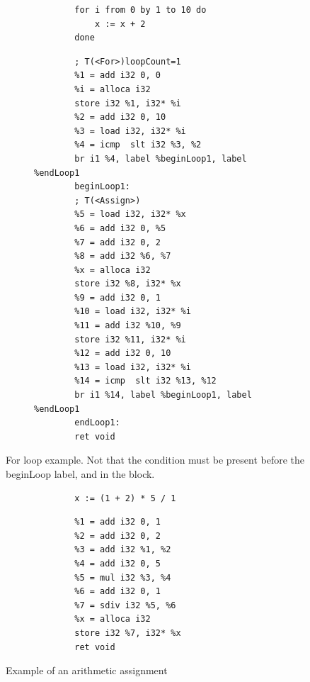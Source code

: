 \documentclass[letterpaper]{article}
\begin{document}
\begin{figure}[H]
    \begin{subfigure}{.5\textwidth}
        \begin{lstlisting}
        for i from 0 by 1 to 10 do
            x := x + 2
        done
        \end{lstlisting}
    \end{subfigure}
    \begin{subfigure}{.5\textwidth}
        \begin{lstlisting}
        ; T(<For>)loopCount=1
    	%1 = add i32 0, 0
    	%i = alloca i32
    	store i32 %1, i32* %i
    	%2 = add i32 0, 10
    	%3 = load i32, i32* %i
    	%4 = icmp  slt i32 %3, %2
    	br i1 %4, label %beginLoop1, label %endLoop1
    	beginLoop1:
    	; T(<Assign>)
    	%5 = load i32, i32* %x
    	%6 = add i32 0, %5
    	%7 = add i32 0, 2
    	%8 = add i32 %6, %7
    	%x = alloca i32
    	store i32 %8, i32* %x
    	%9 = add i32 0, 1
    	%10 = load i32, i32* %i
    	%11 = add i32 %10, %9
    	store i32 %11, i32* %i
    	%12 = add i32 0, 10
    	%13 = load i32, i32* %i
    	%14 = icmp  slt i32 %13, %12
    	br i1 %14, label %beginLoop1, label %endLoop1
    	endLoop1:
    	ret void
        \end{lstlisting}
    \end{subfigure}
    \caption{For loop example. Not that the condition must be present
    before the beginLoop label, and in the block.}
\end{figure}


\begin{figure}[H]
    \begin{subfigure}{.5\textwidth}
        \begin{lstlisting}
        x := (1 + 2) * 5 / 1
        \end{lstlisting}
    \end{subfigure}
    \begin{subfigure}{.5\textwidth}
        \begin{lstlisting}
        %1 = add i32 0, 1
    	%2 = add i32 0, 2
    	%3 = add i32 %1, %2
    	%4 = add i32 0, 5
    	%5 = mul i32 %3, %4
    	%6 = add i32 0, 1
    	%7 = sdiv i32 %5, %6
    	%x = alloca i32
    	store i32 %7, i32* %x
    	ret void
        \end{lstlisting}
    \end{subfigure}
    \caption{Example of an arithmetic assignment}
\end{figure}
\end{document}
